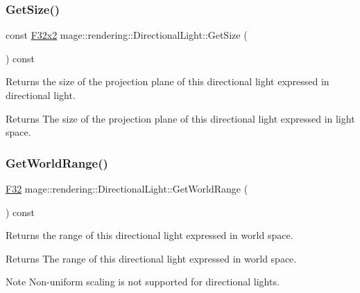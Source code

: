 \subsubsection{\texorpdfstring{Get\+Size()}{GetSize()}}
{\footnotesize\ttfamily const \mbox{\hyperlink{namespacemage_aee4759dedc8def6c6dec26b5c7eddf29}{F32x2}} mage\+::rendering\+::\+Directional\+Light\+::\+Get\+Size (\begin{DoxyParamCaption}{ }\end{DoxyParamCaption}) const\hspace{0.3cm}{\ttfamily [noexcept]}}

Returns the size of the projection plane of this directional light expressed in directional light.

\begin{DoxyReturn}{Returns}
The size of the projection plane of this directional light expressed in light space. 
\end{DoxyReturn}
\mbox{\label{classmage_1_1rendering_1_1_directional_light_a62e8286172a0fe23878f23de2dded6cb}} 
\subsubsection{\texorpdfstring{Get\+World\+Range()}{GetWorldRange()}}
{\footnotesize\ttfamily \mbox{\hyperlink{namespacemage_aa97e833b45f06d60a0a9c4fc22ae02c0}{F32}} mage\+::rendering\+::\+Directional\+Light\+::\+Get\+World\+Range (\begin{DoxyParamCaption}{ }\end{DoxyParamCaption}) const\hspace{0.3cm}{\ttfamily [noexcept]}}

Returns the range of this directional light expressed in world space.

\begin{DoxyReturn}{Returns}
The range of this directional light expressed in world space. 
\end{DoxyReturn}
\begin{DoxyNote}{Note}
Non-\/uniform scaling is not supported for directional lights. 
\end{DoxyNote}
\mbox{\label{classmage_1_1rendering_1_1_directional_light_aa81fa39a4d068d879a6d90587ee324d8}} 

